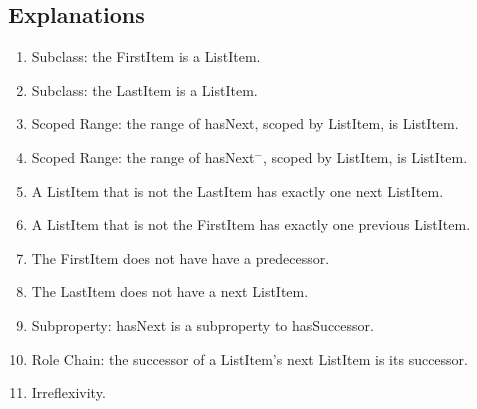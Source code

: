 \subsection{Explanations}
\label{exp:Sequence,}
\begin{enumerate}
\item Subclass: the \textsf{FirstItem} is a \textsf{ListItem}.
\item Subclass: the \textsf{LastItem} is a \textsf{ListItem}.
\item Scoped Range: the range of \textsf{hasNext}, scoped by \textsf{ListItem}, is \textsf{ListItem}.
\item Scoped Range: the range of \textsf{hasNext}$^-$, scoped by \textsf{ListItem}, is \textsf{ListItem}.
\item A \textsf{ListItem} that is not the \textsf{LastItem} has exactly one next \textsf{ListItem}.
\item A \textsf{ListItem} that is not the \textsf{FirstItem} has exactly one previous \textsf{ListItem}.
\item The \textsf{FirstItem} does not have have a predecessor.
\item The \textsf{LastItem} does not have a next \textsf{ListItem}.
\item Subproperty: \textsf{hasNext} is a subproperty to \textsf{hasSuccessor}.
\item Role Chain: the successor of a \textsf{ListItem}'s next \textsf{ListItem} is its successor.
\item Irreflexivity.
\end{enumerate}

\newpage
